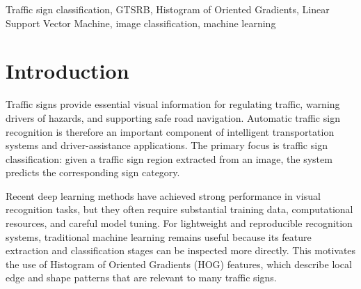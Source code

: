 \documentclass[conference]{IEEEtran}
\begin{document}
\begin{abstract}
Traffic sign classification is an important component of intelligent transportation systems because it supports automatic recognition of road signs from visual data. A lightweight machine learning approach is investigated for traffic sign classification on the German Traffic Sign Recognition Benchmark (GTSRB). In the proposed workflow, annotated sign regions are cropped from the input images, resized to a fixed resolution, converted to grayscale, and represented using Histogram of Oriented Gradients (HOG) descriptors. The extracted features are standardized and classified using a Linear Support Vector Machine (LinearSVC). Experiments on the validation split show that the model achieves an accuracy of 92.36\%, a macro F1-score of 93.43\%, and a weighted F1-score of 92.27\%. A small qualitative test sample obtains 85.00\% accuracy; this sampled result is reported only as an additional inspection and is not treated as the official GTSRB test-set accuracy. The results indicate that HOG features combined with a linear SVM provide a simple and reproducible baseline for traffic sign classification, while also highlighting the need for full test-set evaluation and comparison with stronger baselines.
\end{abstract}

\begin{IEEEkeywords}
Traffic sign classification, GTSRB, Histogram of Oriented Gradients, Linear Support Vector Machine, image classification, machine learning
\end{IEEEkeywords}

\section{Introduction}

Traffic signs provide essential visual information for regulating traffic, warning drivers of hazards, and supporting safe road navigation. Automatic traffic sign recognition is therefore an important component of intelligent transportation systems and driver-assistance applications. The primary focus is traffic sign classification: given a traffic sign region extracted from an image, the system predicts the corresponding sign category.

Recent deep learning methods have achieved strong performance in visual recognition tasks, but they often require substantial training data, computational resources, and careful model tuning. For lightweight and reproducible recognition systems, traditional machine learning remains useful because its feature extraction and classification stages can be inspected more directly. This motivates the use of Histogram of Oriented Gradients (HOG) features, which describe local edge and shape patterns that are relevant to many traffic signs.
\end{document}
